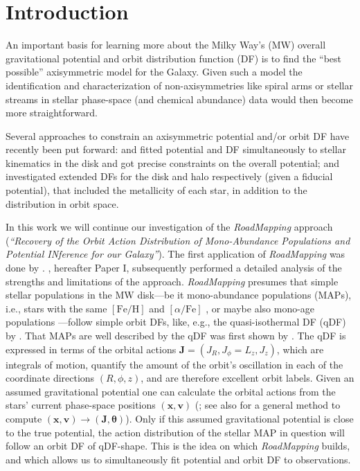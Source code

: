 \documentclass[iop,revtex4,numberedappendix,appendixfloats]{emulateapj}
\newcommand{\vect}[1]{\boldsymbol{#1}}
\newcommand{\RM}{{\sl RoadMapping}}
\begin{document}
\section{Introduction} \label{sec:intro}

An important basis for learning more about the Milky Way's (MW) overall gravitational potential and orbit distribution function (DF) is to find the ``best possible'' axisymmetric model for the Galaxy. Given such a model the identification and characterization of non-axisymmetries like spiral arms or stellar streams in stellar phase-space (and chemical abundance) data would then become more straightforward.

Several approaches to constrain an axisymmetric potential and/or orbit DF have recently been put forward: \citet{2013ApJ...779..115B} and \citet{2014MNRAS.445.3133P} fitted potential and DF simultaneously to stellar kinematics in the disk and got precise constraints on the overall potential; \citet{2015MNRAS.449.3479S} and \citet{2016MNRAS.460.1725D} investigated extended DFs for the disk and halo respectively (given a fiducial potential), that included the metallicity of each star, in addition to the distribution in orbit space.

In this work we will continue our investigation of the \RM{} approach (\emph{``Recovery of the Orbit Action Distribution of Mono-Abundance Populations and Potential INference for our Galaxy''}). The first application of \RM{} was done by \citet{2013ApJ...779..115B}. \citet{2016ApJ...830...97T}, hereafter Paper I, subsequently performed a detailed analysis of the strengths and limitations of the approach. \RM{} presumes that simple stellar populations in the MW disk---be it mono-abundance populations (MAPs), i.e., stars with the same $[\mathrm{Fe}/\mathrm{H}]$ and $[\alpha/\mathrm{Fe}]$ \citep{2012ApJ...751..131B,2012ApJ...753..148B,2012ApJ...755..115B,2016ApJ...823...30B}, or maybe also mono-age populations \citep{2013ApJ...773...43B,2014MNRAS.442.2474M,2016MNRAS.456.3655M,2014A&A...572A..92M,2016ApJ...823..114N}---follow simple orbit DFs, like, e.g., the quasi-isothermal DF (qDF) by \citet{2011MNRAS.413.1889B}. That MAPs are well described by the qDF was first shown by \citep{2013MNRAS.434..652T}. The qDF is expressed in terms of the orbital actions $\vect{J}=(J_R,J_\phi=L_z,J_z)$, which are integrals of motion, quantify the amount of the orbit's oscillation in each of the coordinate directions $(R,\phi,z)$, and are therefore excellent orbit labels. Given an assumed gravitational potential one can calculate the orbital actions from the stars' current phase-space positions $(\vect{x},\vect{v})$ (\citealt{2012MNRAS.426.1324B,2016MNRAS.457.2107S}; see also \citet{2014ApJ...795...95B} for a general method to compute $(\vect{x},\vect{v})\longrightarrow(\vect{J},\vect{\theta})$). Only if this assumed gravitational potential is close to the true potential, the action distribution of the stellar MAP in question will follow an orbit DF of qDF-shape. This is the idea on which \RM{} builds, and which allows us to simultaneously fit potential and orbit DF to observations.
\end{document}
